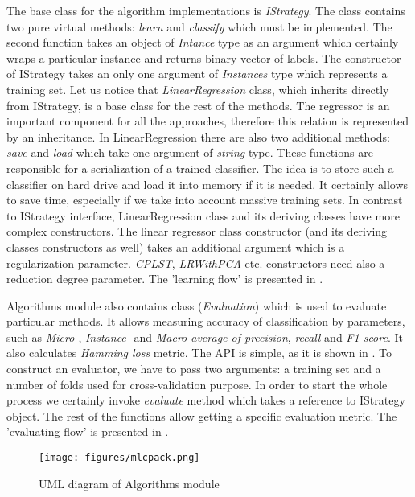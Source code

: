 The base class for the algorithm implementations is \textit{IStrategy}. The class contains two pure virtual methods: \textit{learn} and \textit{classify} which must be implemented. The second function takes an object of \textit{Intance} type as an argument which certainly wraps a particular instance and returns binary vector of labels. The constructor of IStrategy takes an only one argument of \textit{Instances} type which represents a training set. Let us notice that \textit{LinearRegression} class, which inherits directly from IStrategy, is a base class for the rest of the methods. The regressor is an important component for all the approaches, therefore this relation is represented by an inheritance. In LinearRegression there are also two additional methods: \textit{save} and \textit{load} which take one argument of \textit{string} type. These functions are responsible for a serialization of a trained classifier. The idea is to store such a classifier on hard drive and load it into memory if it is needed. It certainly allows to save time, especially if we take into account massive training sets. In contrast to IStrategy interface, LinearRegression class and its deriving classes have more complex constructors. The linear regressor class constructor (and its deriving classes constructors as well) takes an additional argument which is a regularization parameter. \textit{CPLST}, \textit{LRWithPCA} etc. constructors need also a reduction degree parameter. The 'learning flow' is presented in .

Algorithms module also contains class (\textit{Evaluation}) which is used to evaluate particular methods. It allows measuring accuracy of classification by parameters, such as \textit{Micro-}, \textit{Instance-} and \textit{Macro-average of precision}, \textit{recall} and \textit{F1-score}. It also calculates \textit{Hamming loss} metric. The API is simple, as it is shown in . To construct an evaluator, we have to pass two arguments: a training set and a number of folds used for cross-validation purpose. In order to start the whole process we certainly invoke \textit{evaluate} method which takes a reference to IStrategy object. The rest of the functions allow getting a specific evaluation metric. The 'evaluating flow' is presented in .

\begin{figure}
\centering
\caption{UML diagram of Algorithms module}
\label{fig:alg_sh}
\texttt{[image: figures/mlcpack.png]}
\end{figure}

